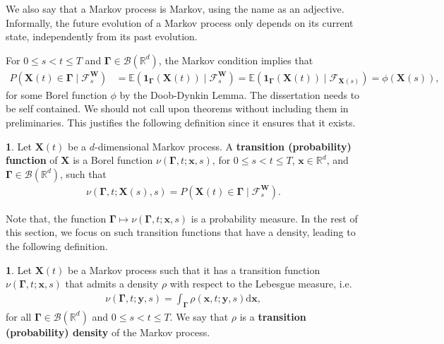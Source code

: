 \documentclass[english]{article}
\newcommand{\comment}[1]{\color{blue}#1\color{black}}
\newcommand{\tomcomment}[1]{\color{orange}#1\color{black}}
\numberwithin{equation}{section}
\numberwithin{figure}{section}
\theoremstyle{bolddescit}
\theoremstyle{definition}
\newtheorem{definition}[theorem]{\protect\definitionname}
\theoremstyle{definition}
\theoremstyle{plain}
\theoremstyle{plain}
\theoremstyle{bolddesc}
\theoremstyle{plain}
\theoremstyle{remark}
\providecommand{\definitionname}{Definition}
\begin{document}
We also say that a Markov process is Markov, using the name as an adjective. Informally, the future evolution of a Markov process only depends on its current state, independently from its past evolution.

For $0 \le s < t \le T$ and $\mathbf{\Gamma} \in \mathcal{B}({\mathbb{R}^d})$, the Markov condition implies that
\begin{align*}
  P(\mathbf{X}(t) \in \mathbf{\Gamma} \mid \mathcal{F}^\mathbf{W}_s)
  &= \mathbb{E}(\mathbf{1}_\mathbf{\Gamma}(\mathbf{X}(t)) \mid \mathcal{F}^\mathbf{W}_s)
  = \mathbb{E}(\mathbf{1}_\mathbf{\Gamma}(\mathbf{X}(t)) \mid \mathcal{F}_{\mathbf{X}(s)})
  = \phi(\mathbf{X}(s)),
\end{align*}
for some Borel function $\phi$ by the Doob-Dynkin Lemma.
\comment{The dissertation needs to be self contained. We should not call upon theorems without including them in preliminaries.}
This justifies the following definition since it ensures that it exists.

\begin{definition}
  Let $\mathbf{X}(t)$ be a $d$-dimensional Markov process. A \textbf{transition (probability) function} of $\mathbf{X}$ is a Borel function $\nu(\mathbf{\Gamma}, t; \mathbf{x}, s)$, for $0 \le s < t \le T$, $\mathbf{x} \in \mathbb{R}^d$, and $\mathbf{\Gamma} \in \mathcal{B}(\mathbb{R}^d)$, such that
  \begin{align*}
    \nu(\mathbf{\Gamma}, t; \mathbf{X}(s), s) = P(\mathbf{X}(t) \in \mathbf{\Gamma} \mid \mathcal{F}^\mathbf{W}_s).
  \end{align*}
\end{definition}

Note that, the function $\mathbf{\Gamma} \mapsto \nu(\mathbf{\Gamma}, t; \mathbf{x}, s)$ is a probability measure.
In the rest of this section, we focus on such transition functions that have a density, leading to the following definition.

\begin{definition}
  Let $\mathbf{X}(t)$ be a Markov process such that it has a transition function $\nu(\mathbf{\Gamma},t;\mathbf{x},s)$ that admits a density $\rho$ with respect to the Lebesgue measure, i.e.
  \begin{align*}
    \nu(\mathbf{\Gamma},t;\mathbf{y},s) = \int_\mathbf{\Gamma} \rho(\mathbf{x},t;\mathbf{y},s) \mathrm{d}\mathbf{x},
  \end{align*}
  for all $\mathbf{\Gamma} \in \mathcal{B}(\mathbb{R}^d)$ and $0 \le s < t \le T$.
  We say that $\rho$ is a \textbf{transition (probability) density} of the Markov process.
\end{definition}
\end{document}
